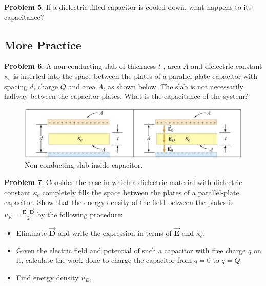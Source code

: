 \documentclass[11pt, letterpaper]{article}
\newcommand{\bv}[2][]{\bm{\vec{#2}_{#1}}}
\begin{document}
\textbf{Problem 5}. If a dielectric-filled capacitor is cooled down, what happens to its capacitance?

\subsection{More Practice}
\textbf{Problem 6}. A non-conducting slab of thickness $t$ , area $A$ and dielectric constant $\kappa_e$ is inserted into the space between the plates of a parallel-plate capacitor with spacing $d$, charge $Q$ and area $A$, as shown below. The slab is not necessarily halfway between the capacitor plates. What is the capacitance of the system?
\begin{figure}[h!]
	\centering
	\includegraphics[scale=0.6]{halfway.png}
	\caption{Non-conducting slab inside capacitor.}
	\label{fig:halfway}
\end{figure}

\textbf{Problem 7}. Consider the case in which a dielectric material with dielectric constant $\kappa_e$ completely fills the space between the plates of a parallel-plate capacitor. Show that the energy density of the field between the plates is $u_E = \frac{\bv{E}\cdot\bv{D}}{2}$ by the following procedure:
\begin{itemize}
	\item Eliminate $\bv{D}$ and write the expression in terms of $\bv{E}$ and $\kappa_e$;
	\item  Given the electric field and potential of such a capacitor with free charge $q$ on it, calculate the work done to charge the capacitor from $q = 0$ to $q = Q$;
	\item Find energy density $u_E$.
\end{itemize}
\end{document}
